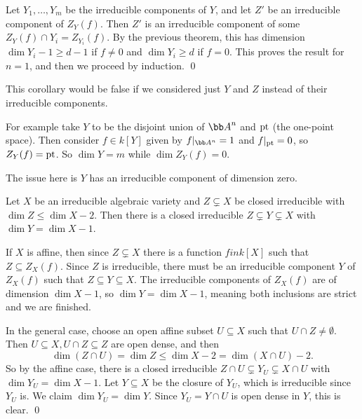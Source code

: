 \ecoro

\bproof

    Let $Y_1,\dots,Y_m$ be the irreducible components of $Y$, and let $Z'$ be an irreducible component of $Z_Y(f)$.
    Then $Z'$ is an irreducible component of some $Z_Y(f)\cap Y_i=Z_{Y_i}(f)$.
    By the previous theorem, this has dimension $\dim Y_i-1\geq d-1$ if $f\neq0$ and $\dim Y_i\geq d$ if $f=0$.
    This proves the result for $n=1$, and then we proceed by induction.
    \qed

\eproof

\bnote

    This corollary would be false if we considered just $Y$ and $Z$ instead of their irreducible components.

    For example take $Y$ to be the disjoint union of $\bA^n$ and ${\rm pt}$ (the one-point space).
    Then consider $f\in k[Y]$ given by $f|_{\bA^n}=1$ and $f|_{\rm pt}=0$, so $Z_Y(f)={\rm pt}$.
    So $\dim Y=m$ while $\dim Z_Y(f)=0$.

    The issue here is $Y$ has an irreducible component of dimension zero.

\enote

\blemm

    Let $X$ be an irreducible algebraic variety and $Z\subsetneq X$ be closed irreducible with $\dim Z\leq\dim X-2$.
    Then there is a closed irreducible $Z\subsetneq Y\subsetneq X$ with $\dim Y=\dim X-1$.

\elemm

\bproof

    If $X$ is affine, then since $Z\subsetneq X$ there is a function $fin k[X]$ such that $Z\subseteq Z_X(f)$.
    Since $Z$ is irreducible, there must be an irreducible component $Y$ of $Z_X(f)$ such that $Z\subseteq Y\subseteq X$.
    The irreducible components of $Z_X(f)$ are of dimension $\dim X-1$, so $\dim Y=\dim X-1$, meaning both inclusions are strict
    and we are finished.

    In the general case, choose an open affine subset $U\subseteq X$ such that $U\cap Z\neq\emptyset$.
    Then $U\subseteq X,U\cap Z\subseteq Z$ are open dense, and then
    $$ \dim(Z\cap U) = \dim Z \leq \dim X - 2 = \dim(X\cap U) - 2 . $$
    So by the affine case, there is a closed irreducible $Z\cap U\subsetneq Y_U\subsetneq X\cap U$ with $\dim Y_U=\dim X-1$.
    Let $Y\subseteq X$ be the closure of $Y_U$, which is irreducible since $Y_U$ is.
    We claim $\dim Y_U=\dim Y$.
    Since $Y_U=Y\cap U$ is open dense in $Y$, this is clear.
    \qed

